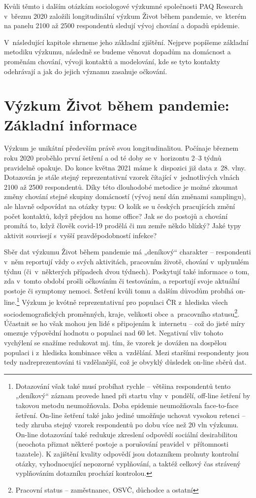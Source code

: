 Kvůli těmto i dalším otázkám sociologové výzkumné společnosti PAQ Research v březnu 2020 založili longitudinální výzkum Život během pandemie, ve kterém na panelu 2100 až 2500 respondentů sledují vývoj chování a dopadů epidemie.

V následující kapitole shrneme jeho základní zjištění. Nejprve popíšeme základní metodiku výzkumu, následně se budeme věnovat dopadům na domácnost a proměnám chování, vývoji kontaktů a modelování, kde se tyto kontakty odehrávají a jak do jejich významu zasahuje očkování.

\section*{Výzkum Život během pandemie: Základní informace}

Výzkum je unikátní především právě svou longitudinalitou. Počínaje březnem roku 2020 proběhlo první šetření a od té doby se v horizontu 2–3 týdnů pravidelně opakuje. Do konce května 2021 máme k dispozici již data z 28. vlny. Dotazován je stále stejný reprezentativní vzorek čítající v jednotlivých vlnách 2100 až 2500 respondentů. Díky této dlouhodobé metodice je možné zkoumat změny chování stejné skupiny domácností (vývoj není dán změnami samplingu), ale hlavně odpovídat na otázky typu: O kolik se u českých pracujících změní počet kontaktů, když přejdou na home office? Jak se do postojů a chování promítá to, když člověk covid-19 prodělá či mu zemře někdo blízký? Jaké typy aktivit souvisejí s vyšší pravděpodobností infekce?

Sběr dat výzkumu Život během pandemie má „deníkový“ charakter – respondenti v něm reportují vždy o svých aktivitách, pracovním životě, chování v uplynulém týdnu (či v některých případech dvou týdnech). Poskytují také informace o tom, zda v tomto období prošli očkováním či testováním, a reportují svoje aktuální postoje či symptomy nemoci. Šetření kvůli tomu a dalším důvodům probíhá on-line.\footnote{Dotazování však také musí probíhat rychle – většina respondentů tento „deníkový“ záznam provede hned při startu vlny v pondělí, off-line šetření by takovou metodu neumožňovala. Doba epidemie neumožňovala face-to-face šetření. On-line šetření také jako jediné umožňuje uchovat vysokou retenci – tedy zhruba stejný vzorek respondentů po dobu více než 20 vln výzkumu. On-line dotazování také redukuje zkreslení odpovědí sociální desirabilitou (neochota přiznat některé postoje a porušování pravidel v přítomnosti tazatele). K zajištění kvality odpovědí jsou dotazníkem prolnuty kontrolní otázky, vyhodnocující nepozorné vyplňování, a taktéž celkový čas strávený vyplňováním dotazníku prochází kontrolou. } Výzkum je kvótně reprezentativní pro populaci ČR z hlediska všech sociodemografických proměnných, kraje, velikosti obce a pracovního statusu\footnote{Pracovní status – zaměstnanec, OSVČ, důchodce a ostatní}. Účastnit se ho však mohou jen lidé s připojením k internetu – což do jisté míry omezuje výpovědní hodnotu o populaci nad 60 let. Negativní vliv tohoto vychýlení se snažíme redukovat mj. tím, že vzorek je dovážen na dospělou populaci i z hlediska kombinace věku a vzdělání. Mezi staršími respondenty jsou tedy nadreprezentováni ti vzdělanější, což je obvyklý důsledek on-line sběrů dat.

